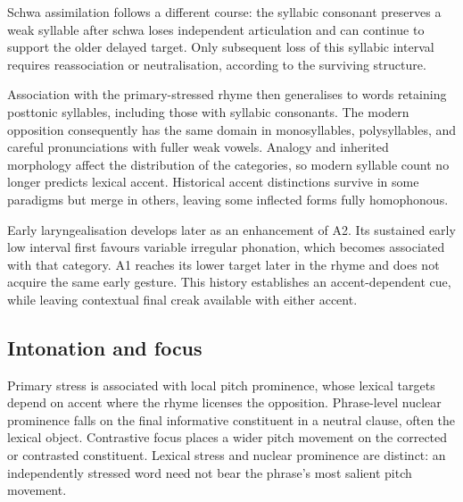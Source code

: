 Schwa assimilation follows a different course: the syllabic consonant preserves a weak syllable after schwa loses independent articulation and can continue to support the older delayed target. Only subsequent loss of this syllabic interval requires reassociation or neutralisation, according to the surviving structure.

Association with the primary-stressed rhyme then generalises to words retaining posttonic syllables, including those with syllabic consonants. The modern opposition consequently has the same domain in monosyllables, polysyllables, and careful pronunciations with fuller weak vowels. Analogy and inherited morphology affect the distribution of the categories, so modern syllable count no longer predicts lexical accent. Historical accent distinctions survive in some paradigms but merge in others, leaving some inflected forms fully homophonous.

Early laryngealisation develops later as an enhancement of A2. Its sustained early low interval first favours variable irregular phonation, which becomes associated with that category. A1 reaches its lower target later in the rhyme and does not acquire the same early gesture. This history establishes an accent-dependent cue, while leaving contextual final creak available with either accent.

\subsection{Intonation and focus}
\label{sec:intonation}

Primary stress is associated with local pitch prominence, whose lexical targets depend on accent where the rhyme licenses the opposition. Phrase-level nuclear prominence falls on the final informative constituent in a neutral clause, often the lexical object. Contrastive focus places a wider pitch movement on the corrected or contrasted constituent. Lexical stress and nuclear prominence are distinct: an independently stressed word need not bear the phrase's most salient pitch movement.

